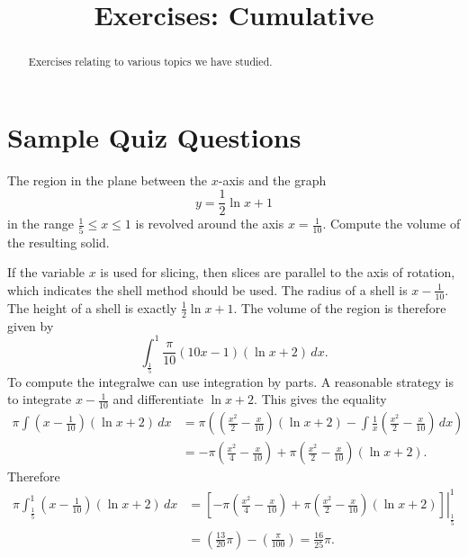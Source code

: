 \documentclass{ximera}
\title{Exercises: Cumulative}
\begin{document}
\begin{abstract}
Exercises relating to various topics we have studied.
\end{abstract}
\maketitle


\section*{Sample Quiz Questions}

\begin{question}%

The region in the plane between the  \(x\)-axis and the graph
\[ y = \frac{1}{2} \ln{x} + 1 \]
 in the range \(\frac{1}{5} \leq x \leq 1\) is revolved around the axis \(x = \frac{1}{10}\). Compute the volume of the resulting solid.
\begin{multiplechoice}
\end{multiplechoice}
\begin{feedback}
If the variable \(x\) is used for slicing, then slices are parallel to the axis of rotation, which indicates the shell method should be used.
The radius of a shell is \(x - \frac{1}{10}\). The height of a shell is exactly \(\frac{1}{2} \ln{x} + 1\).
The volume of the region is therefore given by
\[ \int_{\frac{1}{5}}^{1} \frac{\pi}{10} \left(10 x - 1\right) \left(\ln{x} + 2\right)\, dx. \]
 To compute the integralwe can use integration by parts. A reasonable strategy is to integrate  \(x - \frac{1}{10}\) and differentiate  \(\ln{x} + 2\).
 This gives the equality
\[ \begin{aligned} \pi \int \left(x - \frac{1}{10}\right) \left(\ln{x} + 2\right)\, dx & = \pi \left(\left(\frac{x^{2}}{2} - \frac{x}{10}\right) \left(\ln{x} + 2\right) - \int \frac{1}{x} \left(\frac{x^{2}}{2} - \frac{x}{10}\right)\, dx\right) \\
 & = - \pi \left(\frac{x^{2}}{4} - \frac{x}{10}\right) + \pi \left(\frac{x^{2}}{2} - \frac{x}{10}\right) \left(\ln{x} + 2\right). \end{aligned} \]
Therefore 
\[ \begin{aligned} \pi \int_{\frac{1}{5}}^{1} \left(x - \frac{1}{10}\right) \left(\ln{x} + 2\right)\, dx & = \left. \left[- \pi \left(\frac{x^{2}}{4} - \frac{x}{10}\right) + \pi \left(\frac{x^{2}}{2} - \frac{x}{10}\right) \left(\ln{x} + 2\right) \right] \right|_{\frac{1}{5}}^{1}\\ & = \left(\frac{13}{20} \pi \right) - \left(\frac{\pi}{100} \right) = \frac{16}{25} \pi. \end{aligned} \]
\end{feedback}

\end{question}
\end{document}
